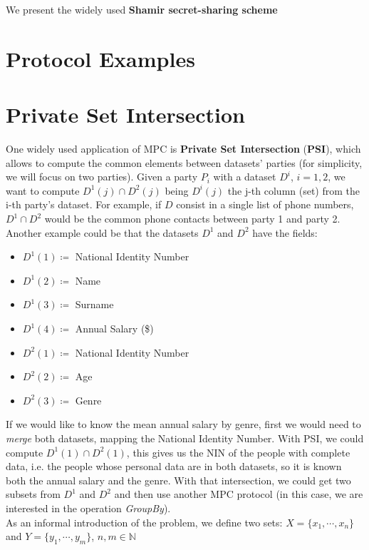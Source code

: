 We present the widely used \textbf{Shamir secret-sharing scheme}

\section{Protocol Examples}


\section{Private Set Intersection}
One widely used application of MPC is \textbf{Private Set Intersection} (\textbf{PSI}), which allows to compute the common elements between datasets' parties (for simplicity, we will focus on two parties).
Given a party $P_i$ with a dataset $D^i$, $i=1,2$, we want to compute $D^1 (j) \cap D^2 (j)$ being $D^i(j)$ the j-th column (set) from the i-th party's dataset. For example, if $D$ consist in a single list of phone numbers, $D^1 \cap D^2$ would be the common phone contacts between party 1 and party 2. Another example could be that the datasets $D^1$ and $D^2$ have the fields:\\

\begin{minipage}{0.4\textwidth}
\begin{itemize}
    \item $D^1(1) \coloneqq$ National Identity Number
    \item $D^1(2) \coloneqq$ Name
    \item $D^1(3) \coloneqq$ Surname
    \item $D^1(4) \coloneqq$ Annual Salary (\$)
\end{itemize}
\end{minipage}
\begin{minipage}{0.4\textwidth}
\begin{itemize}
\item $D^2(1) \coloneqq$ National Identity Number
\item $D^2(2) \coloneqq$ Age
\item $D^2(3) \coloneqq$ Genre
\end{itemize}
\end{minipage}

\vspace*{1 em}

If we would like to know the mean annual salary by genre, first we would need to \textit{merge} both datasets, mapping the National Identity Number.
With PSI, we could compute $D^1(1) \cap D^2(1)$, this  gives us the NIN of the people with complete data, i.e. the people whose personal data are in both datasets, so it is known both the annual salary and the genre.
With that intersection, we could get two subsets from $D^1$ and $D^2$ and then use another MPC protocol (in this case, we are interested in the operation \textit{GroupBy}).\\

As an informal introduction of the problem, we define two sets: $X = \{x_1,\cdots, x_n\}$ and $Y = \{y_1,\cdots, y_m\}$, $n,m\in\mathbb{N}$
